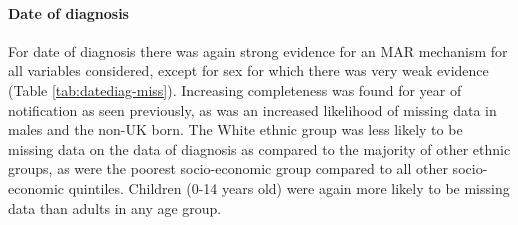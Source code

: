 \documentclass[11pt,twoside]{bristolthesis}
\begin{document}
  \hypertarget{date-of-diagnosis}{%
  \paragraph{Date of diagnosis}\label{date-of-diagnosis}}
  
  For date of diagnosis there was again strong evidence for an MAR mechanism for all variables considered, except for sex for which there was very weak evidence (Table \ref{tab:datediag-miss}). Increasing completeness was found for year of notification as seen previously, as was an increased likelihood of missing data in males and the non-UK born. The White ethnic group was less likely to be missing data on the data of diagnosis as compared to the majority of other ethnic groups, as were the poorest socio-economic group compared to all other socio-economic quintiles. Children (0-14 years old) were again more likely to be missing data than adults in any age group.
  
\end{document}
